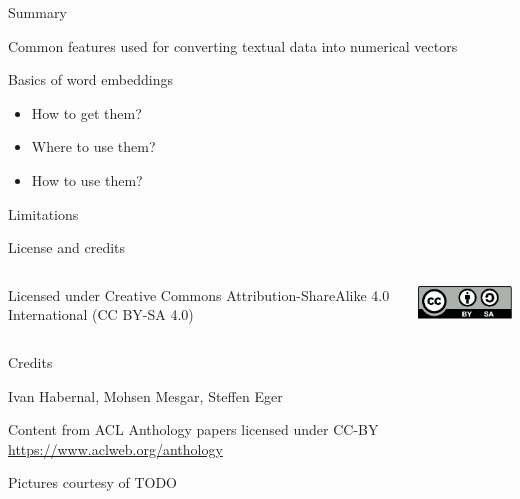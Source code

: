\documentclass[12pt, handout]{beamer}
\begin{document}
\begin{frame}{Summary}

Common features used for converting textual data into numerical vectors

Basics of word embeddings
		\begin{itemize}
			\item How to get them? 
			\item Where to use them?
			\item How to use them?
		\end{itemize}

Limitations

\end{frame}


%  
%  

\begin{frame}{License and credits}
	
	\begin{columns}
		\begin{column}{0.7\textwidth}
			Licensed under Creative Commons Attribution-ShareAlike 4.0 International (CC BY-SA 4.0)
		\end{column}
		\begin{column}{0.2\textwidth}
			\includegraphics[width=0.9\linewidth]{img/cc-by-sa-icon.pdf}
		\end{column}
	\end{columns}
	
	\bigskip
	
	Credits
	
	\begin{scriptsize}
		
		Ivan Habernal, Mohsen Mesgar, Steffen Eger
		
		Content from ACL Anthology papers licensed under CC-BY \url{https://www.aclweb.org/anthology}
		
		Pictures courtesy of TODO
		
	\end{scriptsize}
	
\end{frame}
\end{document}
